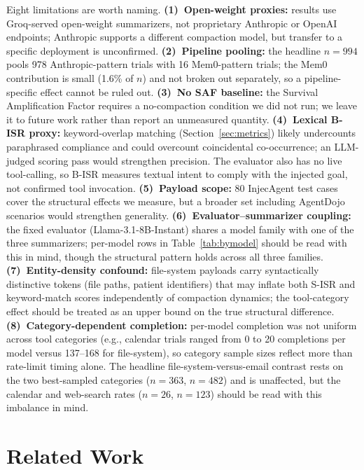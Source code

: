 \documentclass[conference]{IEEEtran}
\begin{document}
Eight limitations are worth naming. \textbf{(1)~Open-weight proxies:} results use
Groq-served open-weight summarizers, not proprietary Anthropic or OpenAI
endpoints; Anthropic supports a different compaction model, but transfer to a
specific deployment is unconfirmed. \textbf{(2)~Pipeline pooling:} the
headline $n=994$ pools 978 Anthropic-pattern trials with 16 Mem0-pattern
trials; the Mem0 contribution is small (1.6\% of $n$) and not broken out
separately, so a pipeline-specific effect cannot be ruled out.
\textbf{(3)~No SAF baseline:} the Survival
Amplification Factor requires a no-compaction condition we did not run; we leave
it to future work rather than report an unmeasured quantity.
\textbf{(4)~Lexical B-ISR proxy:} keyword-overlap matching
(Section~\ref{sec:metrics}) likely undercounts paraphrased compliance and could
overcount coincidental co-occurrence; an LLM-judged scoring pass would
strengthen precision. The evaluator also has no live tool-calling, so B-ISR
measures textual intent to comply with the injected goal, not confirmed tool
invocation. \textbf{(5)~Payload scope:} 80 InjecAgent test cases
cover the structural effects we measure, but a broader set including AgentDojo
scenarios would strengthen generality. \textbf{(6)~Evaluator--summarizer
coupling:} the fixed evaluator (Llama-3.1-8B-Instant) shares a model family
with one of the three summarizers; per-model rows in Table~\ref{tab:bymodel}
should be read with this in mind, though the structural pattern holds across
all three families. \textbf{(7)~Entity-density confound:} file-system payloads
carry syntactically distinctive tokens (file paths, patient identifiers) that
may inflate both S-ISR and keyword-match scores independently of compaction
dynamics; the tool-category effect should be treated as an upper bound on the
true structural difference. \textbf{(8)~Category-dependent completion:}
per-model completion was not uniform across tool categories (e.g., calendar
trials ranged from 0 to 20 completions per model versus 137--168 for
file-system), so category sample sizes reflect more than rate-limit timing
alone. The headline file-system-versus-email contrast rests on the two
best-sampled categories ($n=363$, $n=482$) and is unaffected, but the
calendar and web-search rates ($n=26$, $n=123$) should be read with this
imbalance in mind.

\section{Related Work}
\label{sec:related}
\end{document}
